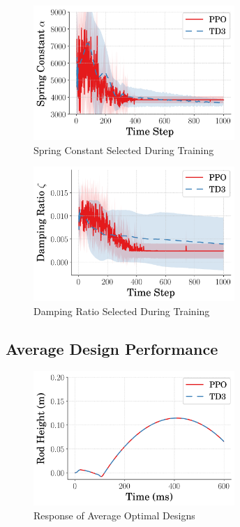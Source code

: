 \documentclass[10pt,twocolumn,letterpaper]{article}
\begin{document}
%
\begin{figure}[tb]
        \begin{center}
        \includegraphics[width = 3in]{figures/ppo_vs_td3/avg_spring_comp.png}  
        \caption{Spring Constant Selected During Training}
        \label{fig:spring_vs_step}
        \end{center}
        \end{figure}
%
\begin{figure}[tb]
        \begin{center}
        \includegraphics[width = 3in]{figures/ppo_vs_td3/avg_zeta_comp.png}  
        \caption{Damping Ratio Selected During Training}
        \label{fig:zeta_vs_step}
        \end{center}
        \end{figure}

\subsection{Average Design Performance}
%
\begin{figure}[tb]
        \begin{center}
        \includegraphics[width = 3in]{figures/ppo_vs_td3/timeseries_height.png}  
        \caption{Response of Average Optimal Designs}
        \label{fig:height_vs_time}
        \end{center}
        \end{figure}
\end{document}
